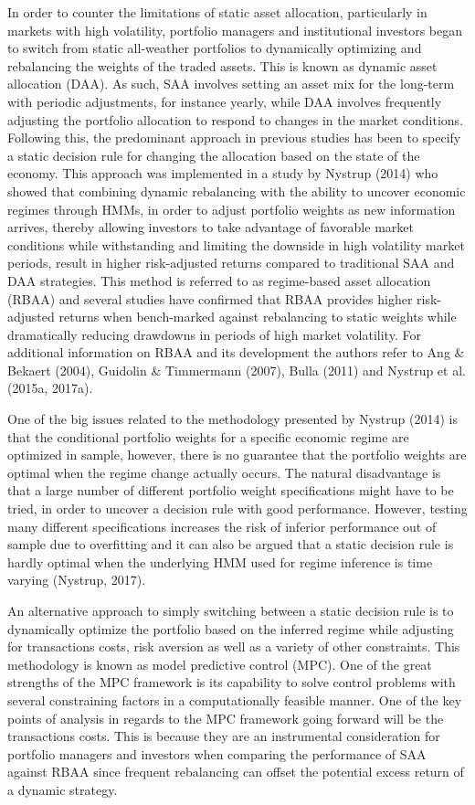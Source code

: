 In order to counter the limitations of static asset allocation, particularly in markets with high volatility, portfolio managers and institutional investors began to switch from static all-weather portfolios to dynamically optimizing and rebalancing the weights of the traded assets. This is known as dynamic asset allocation (DAA). As such, SAA involves setting an asset mix for the long-term with periodic adjustments, for instance yearly, while DAA involves frequently adjusting the portfolio allocation to respond to changes in the market conditions. Following this, the predominant approach in previous studies has been to specify a static decision rule for changing the allocation based on the state of the economy. This approach was implemented in a study by Nystrup (2014) who showed that combining dynamic rebalancing with the ability to uncover economic regimes through HMMs, in order to adjust portfolio weights as new information arrives, thereby allowing investors to take advantage of favorable market conditions while withstanding and limiting the downside in high volatility market periods, result in higher risk-adjusted returns compared to traditional SAA and DAA strategies. This method is referred to as regime-based asset allocation (RBAA) and several studies have confirmed that RBAA provides higher risk-adjusted returns when bench-marked against rebalancing to static weights while dramatically reducing drawdowns in periods of high market volatility. For additional information on RBAA and its development the authors refer to Ang \& Bekaert (2004), Guidolin \& Timmermann (2007), Bulla (2011) and Nystrup et al. (2015a, 2017a). 

One of the big issues related to the methodology presented by Nystrup (2014) is that the conditional portfolio weights for a specific economic regime are optimized in sample, however, there is no guarantee that the portfolio weights are optimal when the regime change actually occurs. The natural disadvantage is that a large number of different portfolio weight specifications might have to be tried, in order to uncover a decision rule with good performance. However, testing many different specifications increases the risk of inferior performance out of sample due to overfitting and it can also be argued that a static decision rule is hardly optimal when the underlying HMM used for regime inference is time varying (Nystrup, 2017).

An alternative approach to simply switching between a static decision rule is to dynamically optimize the portfolio based on the inferred regime while adjusting for transactions costs, risk aversion as well as a variety of other constraints. This methodology is known as model predictive control (MPC). One of the great strengths of the MPC framework is its capability to solve control problems with several constraining factors in a computationally feasible manner. One of the key points of analysis in regards to the MPC framework going forward will be the transactions costs. This is because they are an instrumental consideration for portfolio managers and investors when comparing the performance of SAA against RBAA since frequent rebalancing can offset the potential excess return of a dynamic strategy. 

